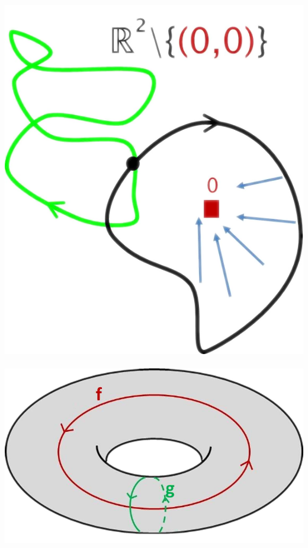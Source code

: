 \documentclass[a4paper,11pt,notitlepage]{report}
\theoremstyle{definition}
\begin{document}
\includegraphics[scale=0.4]{images/Homotop_Schleifen_R_ohne_0.png} $\qquad$ \includegraphics[scale=0.4]{images/nicht_homotop_Wege_Torus.png}
\end{document}
